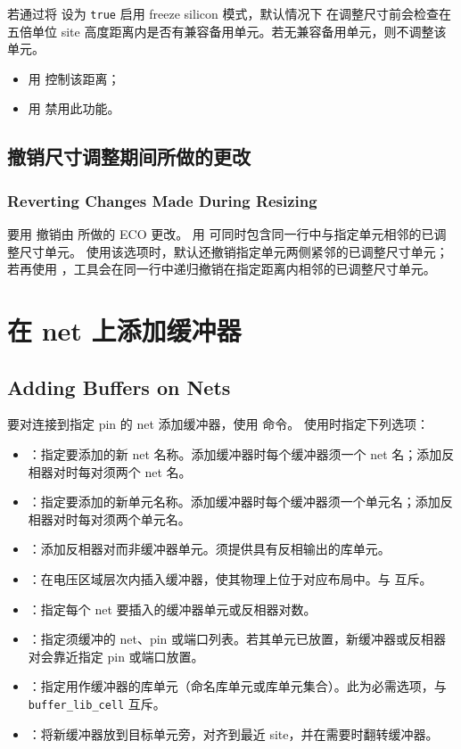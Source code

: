 若通过将  设为 \texttt{true} 启用 freeze silicon 模式，默认情况下  在调整尺寸前会检查在五倍单位 site 高度距离内是否有兼容备用单元。若无兼容备用单元，则不调整该单元。
\begin{itemize}
  \item 用  控制该距离；
  \item 用  禁用此功能。
\end{itemize}

\subsection{撤销尺寸调整期间所做的更改}
\subsubsection*{Reverting Changes Made During Resizing}

要用  撤销由  所做的 ECO 更改。
用  可同时包含同一行中与指定单元相邻的已调整尺寸单元。
使用该选项时，默认还撤销指定单元两侧紧邻的已调整尺寸单元；若再使用 ，工具会在同一行中递归撤销在指定距离内相邻的已调整尺寸单元。

\section{在 net 上添加缓冲器}
\subsection*{Adding Buffers on Nets}

要对连接到指定 pin 的 net 添加缓冲器，使用  命令。
使用时指定下列选项：
\begin{itemize}
  \item {}：指定要添加的新 net 名称。添加缓冲器时每个缓冲器须一个 net 名；添加反相器对时每对须两个 net 名。
  \item {}：指定要添加的新单元名称。添加缓冲器时每个缓冲器须一个单元名；添加反相器对时每对须两个单元名。
  \item {}：添加反相器对而非缓冲器单元。须提供具有反相输出的库单元。
  \item {}：在电压区域层次内插入缓冲器，使其物理上位于对应布局中。与  互斥。
  \item {}：指定每个 net 要插入的缓冲器单元或反相器对数。
  \item {}：指定须缓冲的 net、pin 或端口列表。若其单元已放置，新缓冲器或反相器对会靠近指定 pin 或端口放置。
  \item {}：指定用作缓冲器的库单元（命名库单元或库单元集合）。此为必需选项，与 \texttt{buffer\_lib\_cell} 互斥。
  \item {}：将新缓冲器放到目标单元旁，对齐到最近 site，并在需要时翻转缓冲器。
\end{itemize}

